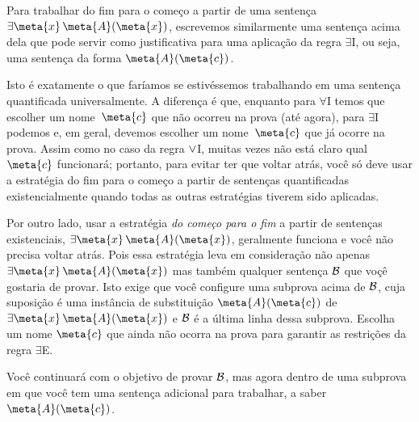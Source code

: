 Para trabalhar do fim para o come\c co  a partir de uma senten\c ca $\exists \meta{x}\, \atom{\meta{A}}{\meta{x}}$, escrevemos similarmente uma senten\c ca acima dela que pode servir como justificativa para uma aplica\c c\~ao da regra $\exists$I, ou seja, uma senten\c ca da forma $\atom{\meta{A}}{\meta{c}}$. 
\begin{fitchproof}
	\ellipsesline
\end{fitchproof}
Isto \'e exatamente o que far\'iamos se estiv\'essemos trabalhando em uma senten\c ca quantificada universalmente. A diferen\c ca \'e que, enquanto para $\forall$I temos que escolher um nome~$\meta{c}$ que n\~ao ocorreu na prova (at\'e agora), para $\exists$I podemos e, em geral, devemos escolher um nome~$\meta{c}$ que j\'a ocorre na prova. Assim como no caso da regra $\vee$I, muitas vezes n\~ao est\'a claro qual $\meta{c}$ funcionar\'a; portanto, para evitar ter que voltar atr\'as, voc\^e s\'o deve usar a estrat\'egia do fim para o come\c co a partir de senten\c cas quantificadas existencialmente quando todas as outras estrat\'egias tiverem sido aplicadas.

Por outro lado, usar a estrat\'egia \emph{do come\c co para o fim} a partir de senten\c cas existenciais,  $\exists \meta{x}\, \atom{\meta{A}}{\meta{x}}$, geralmente funciona e voc\^e n\~ao precisa voltar atr\'as. Pois essa estrat\'egia  leva em considera\c c\~ao n\~ao apenas
 $\exists \meta{x}\, \atom{\meta{A}}{\meta{x}}$  mas tamb\'em qualquer senten\c ca $\mathcal{B}$ que vo\c c\^e gostaria de provar. Isto exige que voc\^e configure uma subprova acima de $\mathcal{B}$, cuja suposi\c c\~ao \'e uma inst\^ancia de substitui\c c\~ao $\atom{\meta{A}}{\meta{c}}$ de $\exists \meta{x}\, \atom{\meta{A}}{\meta{x}}$ e $\mathcal{B}$  \'e a \'ultima linha dessa subprova. Escolha um nome $\meta{c}$ que ainda n\~ao ocorra na prova para garantir as restri\c c\~oes da regra $\exists$E.
 
\begin{fitchproof}
	\ellipsesline
	\ellipsesline
	\open
	\ellipsesline
	\close
\end{fitchproof}
Voc\^e continuar\'a com o objetivo de provar $\mathcal{B}$, mas agora dentro de uma subprova em que voc\^e tem uma senten\c ca adicional para trabalhar, a saber~$\atom{\meta{A}}{\meta{c}}$.


